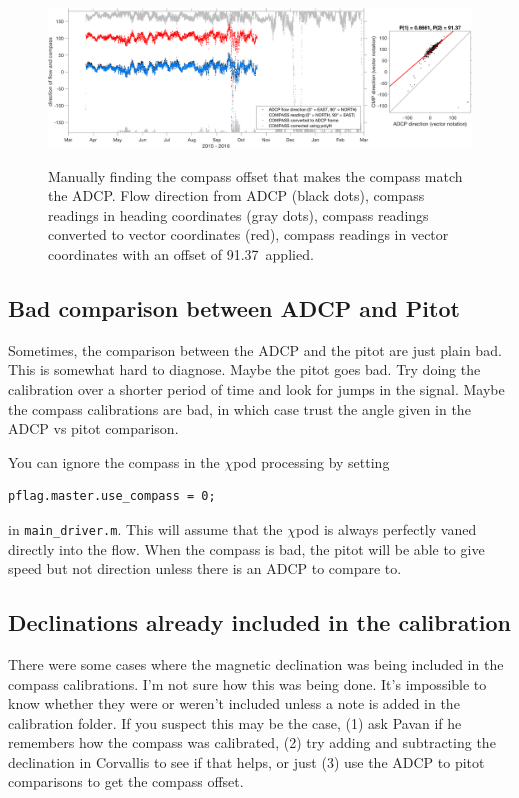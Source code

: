 \documentclass[12pt]{article}
\begin{document}
\begin{figure}[h]
  \centering \centering\noindent\includegraphics[width=16cm,angle=0]{./figs/compare_ADCP_direction_to_compass.png}\\
    \caption{Manually finding the compass offset that makes the compass match the ADCP. Flow direction from ADCP (black dots), compass readings in heading coordinates (gray dots), compass readings converted to vector coordinates (red), compass readings in vector coordinates with an offset of 91.37\degree \, applied.}\label{fig:findcompassoffset}
\end{figure}

\subsection{Bad comparison between ADCP and Pitot}
Sometimes, the comparison between the ADCP and the pitot are just plain bad. This is somewhat hard to diagnose. Maybe the pitot goes bad. Try doing the calibration over a shorter period of time and look for jumps in the signal. Maybe the compass calibrations are bad, in which case trust the angle given in the ADCP vs pitot comparison. 

You can ignore the compass in the $\chi$pod processing by setting 
\begin{verbatim}
pflag.master.use_compass = 0;
\end{verbatim}
in \texttt{main\_driver.m}. This will assume that the $\chi$pod is always perfectly vaned directly into the flow. When the compass is bad, the pitot will be able to give speed but not direction unless there is an ADCP to compare to.

\subsection{Declinations already included in the calibration}

There were some cases where the magnetic declination was being included in the compass calibrations. I'm not sure how this was being done. It's impossible to know whether they were or weren't included unless a note is added in the calibration folder. If you suspect this may be the case, (1) ask Pavan if he remembers how the compass was calibrated, (2) try adding and subtracting the declination in Corvallis to see if that helps, or just (3) use the ADCP to pitot comparisons to get the compass offset.
\end{document}
